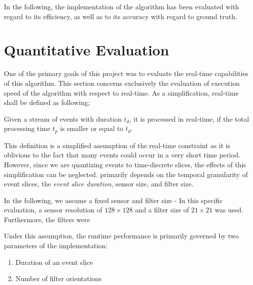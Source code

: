 In the following, the implementation of the algorithm has been evaluated with regard to its efficiency, as well as to its accuracy with regard to ground truth.

\section{Quantitative Evaluation}

One of the primary goals of this project was to evaluate the real-time capabilities of this algorithm.
This section concerns exclusively the evaluation of execution speed of the algorithm with respect to real-time. As a simplification, real-time shall be defined as following;
\begin{defwrp}
	Given a stream of events with duration $t_d$, it is processed in real-time, if the total processing time $t_p$ is smaller or equal to $t_d$.
\end{defwrp}

This definition is a simplified assumption of the real-time constraint as it is oblivious to the fact that many events could occur in a very short time period.
However, since we are quantizing events to time-discrete slices, the effects of this simplification can be neglected.
 primarily depends on the temporal granularity of event slices,  the \textit{event slice duration}, sensor size, and filter size.

In the following, we assume a fixed sensor and filter size - 
In this specific evaluation, a sensor resolution of $128\times128$ and a filter size of $21\times21$ was used.
Furthermore, the filters were 

Under this assumption, the runtime performance is primarily governed by two parameters of the implementation:
\begin{enumerate}
	\item Duration of an event slice
	\item Number of filter orientations
\end{enumerate}

